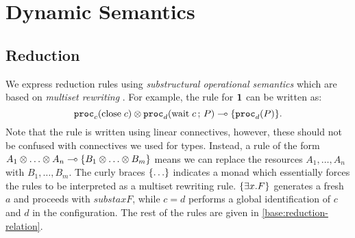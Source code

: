 
\section{Dynamic Semantics}
\label{base:semantics}

\subsection{Reduction}

We express reduction rules using \emph{substructural operational semantics} \cite{Simmons12} which are based on \emph{multiset rewriting} \cite{CervesatoS09}. For example, the rule for $\mathbf{1}$ can be written as:
$$ \mathtt{proc}_{c}(\mathrm{close}\;c) \otimes \mathtt{proc}_{d}(\mathrm{wait}\;c \,;\, P) \multimap \lbrace\mathtt{proc}_{d}(P)\rbrace. $$
Note that the rule is written using linear connectives, however, these should not be confused with connectives we used for types. Instead, a rule of the form $A_1 \otimes \ldots \otimes A_n \multimap \lbrace B_1 \otimes \ldots \otimes B_m\rbrace$ means we can replace the resources $A_1, \ldots, A_n$ with $B_1, \ldots, B_m$. The curly braces $\lbrace\ldots\rbrace$ indicates a monad which essentially forces the rules to be interpreted as a multiset rewriting rule. $\lbrace\exists x. F\rbrace$ generates a fresh $a$ and proceeds with $subst a x F$, while $c = d$ performs a global identification of $c$ and $d$ in the configuration. The rest of the rules are given in \cref{base:reduction-relation}.

